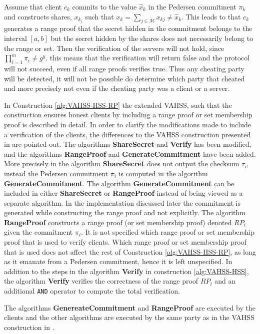 Assume that client $c_k$ commits to the value $\hat{x}_k$ in the Pedersen commitment $\pi_k$ and constructs shares, $x_k_j$ such that $x_k = \sum_{j\in\mathcal{M}}x_{kj} \neq \hat{x}_k$. This leads to that $c_k$ generates a range proof that the secret hidden in the commitment belongs to the interval $[a,b]$ but the secret hidden by the shares does not necessarily belong to the range or set. Then the verification of the servers will not hold, since  $\prod_{i=1}^m \pi_i \neq g^y$. this means that the verification will return false and the protocol will not succeed, even if all  range proofs verifies true. Thus any cheating party will be detected, it will not be possible do determine which party that cheated and more precisely not even if the cheating party was a client or a server. 

In Construction \ref{alg:VAHSS-HSS-RP} the extended VAHSS, such that the construction ensures honest clients by including a range proof or set membership proof is described in detail. In order to clarify the modifications made to include a verification of the clients, the differences to the VAHSS construction presented in \cite{SumItUp} are pointed out. The algorithms \textbf{ShareSecret} and \textbf{Verify} has been modified,  and the algorithms \textbf{RangeProof} and \textbf{GenerateCommitment} have been added. More precisely in the algorithm \textbf{ShareSecret} does not output the checksum $\tau_i$, instead the Pedersen commitment $\pi_i$ is computed in the algorithm \textbf{GenerateCommitment}. The algorithm  \textbf{GenerateCommitment} can be included in either \textbf{ShareSecret}  or \textbf{RangeProof} instead of being viewed as a separate algorithm. In the implementation discussed later the commitment is generated while constructing the range proof and not explicitly. The algorithm \textbf{RangeProof} constructs a range proof (or set membership proof) denoted $RP_i$ given the commitment $\pi_i$. It is not specified which range proof or set membership proof that is used to verify clients.  Which range proof or set membership proof that is used does not affect the rest of Construction \ref{alg:VAHSS-HSS-RP}, as long as it emanate from a Pedersen commitment, hence it is left unspecified. In addition to the steps in the algorithm \textbf{Verify} in construction \ref{alg:VAHSS-HSS}, the algorithm \textbf{Verify} verifies the correctness of the range proof $RP_i$ and an additional \texttt{AND} operator to compute the total verification.  

The  algorithms \textbf{GenereateCommitment} and \textbf{RangeProof} are executed by the clients and the other algorithms are executed by the same party as in the  VAHSS construction in \cite{SumItUp}. 

